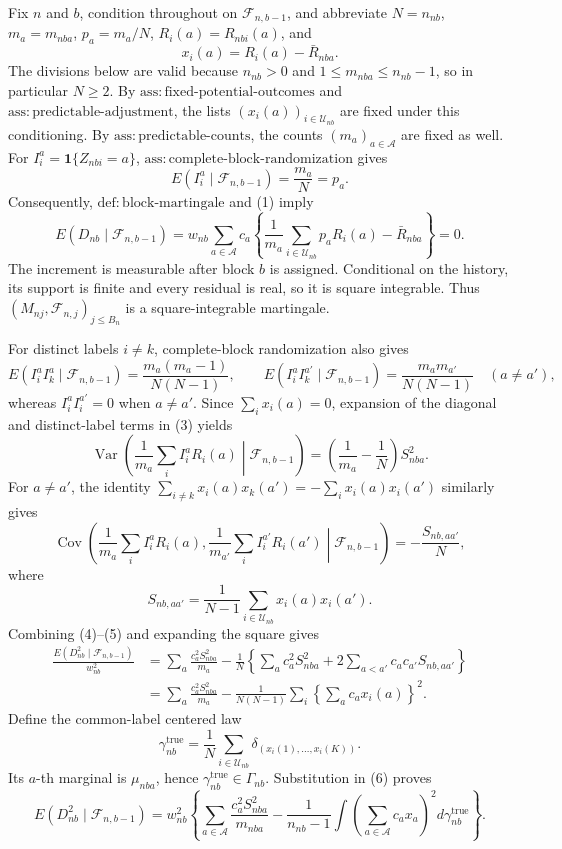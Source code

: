 Fix \(n\) and \(b\), condition throughout on \(\mathcal F_{n,b-1}\), and abbreviate \(N=n_{nb}\), \(m_a=m_{nba}\), \(p_a=m_a/N\), \(R_i(a)=R_{nbi}(a)\), and
\[
x_i(a)=R_i(a)-\bar R_{nba}.
\]
The divisions below are valid because \(n_{nb}>0\) and \(1\le m_{nba}\le n_{nb}-1\), so in particular \(N\ge2\). By \(\mathrm{ass:fixed\text{-}potential\text{-}outcomes}\) and \(\mathrm{ass:predictable\text{-}adjustment}\), the lists \((x_i(a))_{i\in\mathcal U_{nb}}\) are fixed under this conditioning. By \(\mathrm{ass:predictable\text{-}counts}\), the counts \((m_a)_{a\in\mathcal A}\) are fixed as well. For \(I_i^a=\mathbf 1\{Z_{nbi}=a\}\), \(\mathrm{ass:complete\text{-}block\text{-}randomization}\) gives
\[
E(I_i^a\mid\mathcal F_{n,b-1})=\frac{m_a}{N}=p_a.
\tag{1}
\]
Consequently, \(\mathrm{def:block\text{-}martingale}\) and (1) imply
\[
E(D_{nb}\mid\mathcal F_{n,b-1})
=w_{nb}\sum_{a\in\mathcal A}c_a
\left\{\frac1{m_a}\sum_{i\in\mathcal U_{nb}}p_aR_i(a)-\bar R_{nba}\right\}=0.
\tag{2}
\]
The increment is measurable after block \(b\) is assigned. Conditional on the history, its support is finite and every residual is real, so it is square integrable. Thus \((M_{nj},\mathcal F_{n,j})_{j\le B_n}\) is a square-integrable martingale.

For distinct labels \(i\ne k\), complete-block randomization also gives
\[
E(I_i^aI_k^a\mid\mathcal F_{n,b-1})
=\frac{m_a(m_a-1)}{N(N-1)},
\qquad
E(I_i^aI_k^{a'}\mid\mathcal F_{n,b-1})
=\frac{m_am_{a'}}{N(N-1)}\quad(a\ne a'),
\tag{3}
\]
whereas \(I_i^aI_i^{a'}=0\) when \(a\ne a'\). Since \(\sum_i x_i(a)=0\), expansion of the diagonal and distinct-label terms in (3) yields
\[
\operatorname{Var}\!\left(\frac1{m_a}\sum_iI_i^aR_i(a)\middle|\mathcal F_{n,b-1}\right)
=\left(\frac1{m_a}-\frac1N\right)S_{nba}^2.
\tag{4}
\]
For \(a\ne a'\), the identity \(\sum_{i\ne k}x_i(a)x_k(a')=-\sum_i x_i(a)x_i(a')\) similarly gives
\[
\operatorname{Cov}\!\left(\frac1{m_a}\sum_iI_i^aR_i(a),
\frac1{m_{a'}}\sum_iI_i^{a'}R_i(a')\middle|\mathcal F_{n,b-1}\right)
=-\frac{S_{nb,aa'}}N,
\tag{5}
\]
where
\[
S_{nb,aa'}=\frac1{N-1}\sum_{i\in\mathcal U_{nb}}x_i(a)x_i(a').
\]
Combining (4)--(5) and expanding the square gives
\[
\begin{aligned}
\frac{E(D_{nb}^2\mid\mathcal F_{n,b-1})}{w_{nb}^2}
&=\sum_a\frac{c_a^2S_{nba}^2}{m_a}
-\frac1N\left\{\sum_a c_a^2S_{nba}^2+2\sum_{a<a'}c_ac_{a'}S_{nb,aa'}\right\}\\
&=\sum_a\frac{c_a^2S_{nba}^2}{m_a}
-\frac1{N(N-1)}\sum_i\left\{\sum_a c_ax_i(a)\right\}^2.
\end{aligned}
\tag{6}
\]
Define the common-label centered law
\[
\gamma_{nb}^{\mathrm{true}}
=\frac1N\sum_{i\in\mathcal U_{nb}}\delta_{(x_i(1),\ldots,x_i(K))}.
\]
Its \(a\)-th marginal is \(\mu_{nba}\), hence \(\gamma_{nb}^{\mathrm{true}}\in\Gamma_{nb}\). Substitution in (6) proves
\[
E(D_{nb}^2\mid\mathcal F_{n,b-1})
=w_{nb}^2\left\{\sum_{a\in\mathcal A}\frac{c_a^2S_{nba}^2}{m_{nba}}
-\frac1{n_{nb}-1}\int\left(\sum_{a\in\mathcal A}c_ax_a\right)^2d\gamma_{nb}^{\mathrm{true}}\right\}.
\tag{7}
\]

